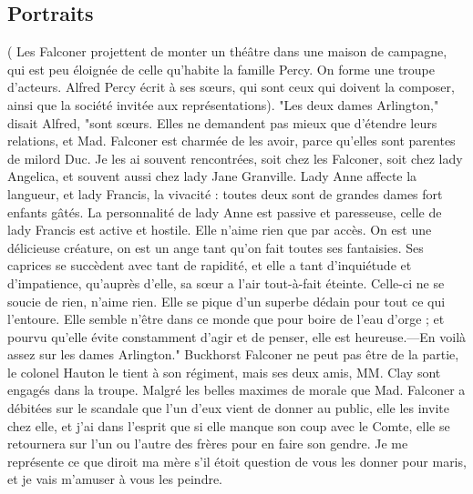 \subsection{Portraits}
( Les Falconer projettent de monter un théâtre dans une maison de campagne, qui est peu éloignée de celle qu'habite la famille Percy. On forme une troupe d'acteurs. Alfred\setcounter{page}{120}  Percy écrit à ses sœurs, qui sont ceux qui doivent la composer, ainsi que la société invitée aux représentations).
"Les deux dames Arlington," disait Alfred, "sont sœurs. Elles ne demandent pas mieux que d'étendre leurs relations, et Mad. Falconer est charmée de les avoir, parce qu'elles sont parentes de milord Duc.
Je les ai souvent rencontrées, soit chez les Falconer, soit chez lady Angelica, et souvent aussi chez lady Jane Granville. Lady Anne affecte la langueur, et lady Francis, la vivacité : toutes deux sont de grandes dames fort enfants gâtés. La personnalité de lady Anne est passive et paresseuse, celle de lady Francis est active et hostile. Elle n'aime rien que par accès. On est une délicieuse créature, on est un ange tant qu'on fait toutes ses fantaisies. Ses caprices se succèdent avec tant de rapidité, et elle a tant d'inquiétude et d'impatience, qu'auprès d'elle, sa sœur a l'air tout-à-fait éteinte. Celle-ci ne se soucie de rien, n'aime rien. Elle se pique d'un superbe dédain pour tout ce qui l'entoure. Elle semble n'être dans ce monde que pour boire de l'eau d'orge ; et pourvu qu'elle évite constamment d'agir et de penser, elle est heureuse.—En voilà assez sur les dames Arlington."\setcounter{page}{121} Buckhorst Falconer ne peut pas être de la partie, le colonel Hauton le tient à son régiment, mais ses deux amis, MM. Clay sont engagés dans la troupe. Malgré les belles maximes de morale que Mad. Falconer a débitées sur le scandale que l'un d'eux vient de donner au public, elle les invite chez elle, et j'ai dans l'esprit que si elle manque son coup avec le Comte, elle se retournera sur l'un ou l'autre des frères pour en faire son gendre. Je me représente ce que diroit ma mère s'il étoit question de vous les donner pour maris, et je vais m'amuser à vous les peindre.
